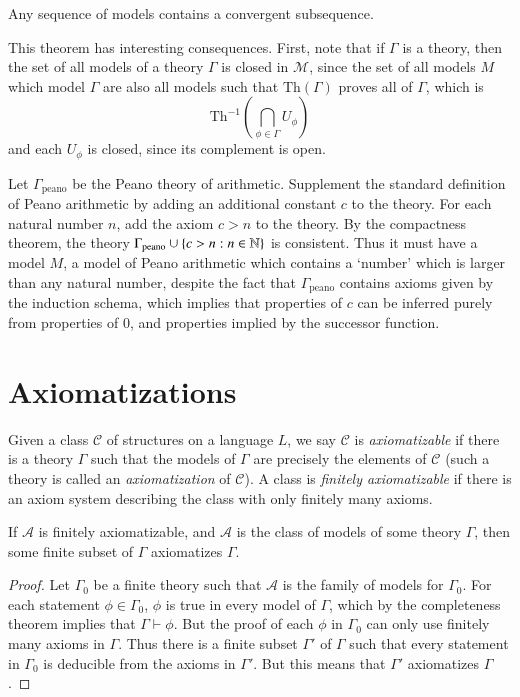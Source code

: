 \begin{theorem}
    Any sequence of models contains a convergent subsequence.
\end{theorem}

This theorem has interesting consequences. First, note that if $\Gamma$ is a theory, then the set of all models of a theory $\Gamma$ is closed in $\mathcal{M}$, since the set of all models $M$ which model $\Gamma$ are also all models such that $\text{Th}(\Gamma)$ proves all of $\Gamma$, which is
%
\[ \text{Th}^{-1} \left(\bigcap_{\phi \in \Gamma} U_\phi \right) \]
%
and each $U_\phi$ is closed, since its complement is open.

\begin{example}
    Let $\Gamma_{\text{peano}}$ be the Peano theory of arithmetic. Supplement the standard definition of Peano arithmetic by adding an additional constant $c$ to the theory. For each natural number $n$, add the axiom $c > n$ to the theory. By the compactness theorem, the theory $\Gamma_{\text{peano}} \cup \{ c > n : n \in \operatorname{\mathbb{N}} \}$ is consistent. Thus it must have a model $M$, a model of Peano arithmetic which contains a `number' which is larger than any natural number, despite the fact that $\Gamma_{\text{peano}}$ contains axioms given by the induction schema, which implies that properties of $c$ can be inferred purely from properties of $0$, and properties implied by the successor function.
\end{example}

\section{Axiomatizations}

Given a class $\mathcal{C}$ of structures on a language $L$, we say $\mathcal{C}$ is \emph{axiomatizable} if there is a theory $\Gamma$ such that the models of $\Gamma$ are precisely the elements of $\mathcal{C}$ (such a theory is called an \emph{axiomatization} of $\mathcal{C}$). A class is \emph{finitely axiomatizable} if there is an axiom system describing the class with only finitely many axioms.

\begin{theorem}
    If $\mathcal{A}$ is finitely axiomatizable, and $\mathcal{A}$ is the class of models of some theory $\Gamma$, then some finite subset of $\Gamma$ axiomatizes $\Gamma$.
\end{theorem}
\begin{proof}
    Let $\Gamma_0$ be a finite theory such that $\mathcal{A}$ is the family of models for $\Gamma_0$. For each statement $\phi \in \Gamma_0$, $\phi$ is true in every model of $\Gamma$, which by the completeness theorem implies that $\Gamma \vdash \phi$. But the proof of each $\phi$ in $\Gamma_0$ can only use finitely many axioms in $\Gamma$. Thus there is a finite subset $\Gamma'$ of $\Gamma$ such that every statement in $\Gamma_0$ is deducible from the axioms in $\Gamma'$. But this means that $\Gamma'$ axiomatizes $\Gamma$.
\end{proof}

